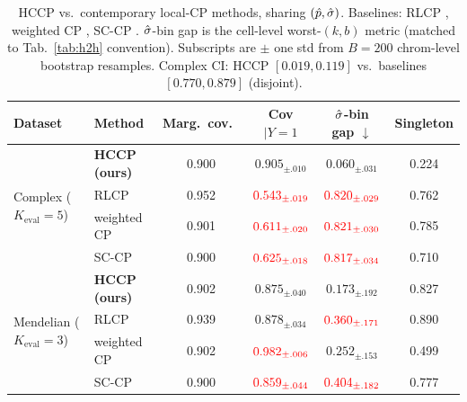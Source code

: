 \begin{table}[h]
\centering
\footnotesize
\caption{HCCP vs.\ contemporary local-CP methods, sharing $(\hat{p}, \hat{\sigma})$. Baselines: RLCP \citep{hore2025rlcp}, weighted CP \citep{tibshirani2019weighted}, SC-CP \citep{vanderlaan2024sccp}. $\hat{\sigma}$-bin gap is the cell-level worst-$(k,b)$ metric (matched to Tab.~\ref{tab:h2h} convention). Subscripts are $\pm$ one std from $B = 200$ chrom-level bootstrap resamples. Complex CI: HCCP $[0.019, 0.119]$ vs.\ baselines $[0.770, 0.879]$ (disjoint).}
\label{tab:cp_baselines}
\setlength{\tabcolsep}{3pt}
\begin{tabular}{llcccc}
\toprule
Dataset & Method & Marg.\ cov.\ & Cov$|Y{=}1$ & $\hat{\sigma}$-bin gap $\downarrow$ & Singleton \\
\midrule
\multirow{4}{*}{Complex ($K_{\mathrm{eval}} = 5$)}
 & \textbf{HCCP (ours)} & 0.900 & $\mathbf{0.905_{\pm .010}}$         & $\mathbf{0.060_{\pm .031}}$         & 0.224 \\
 & RLCP                 & 0.952 & $\textcolor{red}{0.543_{\pm .019}}$ & $\textcolor{red}{0.820_{\pm .029}}$ & 0.762 \\
 & weighted CP          & 0.901 & $\textcolor{red}{0.611_{\pm .020}}$ & $\textcolor{red}{0.821_{\pm .030}}$ & 0.785 \\
 & SC-CP                & 0.900 & $\textcolor{red}{0.625_{\pm .018}}$ & $\textcolor{red}{0.817_{\pm .034}}$ & 0.710 \\
\midrule
\multirow{4}{*}{Mendelian ($K_{\mathrm{eval}} = 3$)}
 & \textbf{HCCP (ours)} & 0.902 & $\mathbf{0.875_{\pm .040}}$         & $\mathbf{0.173_{\pm .192}}$         & 0.827 \\
 & RLCP                 & 0.939 & $0.878_{\pm .034}$                  & $\textcolor{red}{0.360_{\pm .171}}$ & 0.890 \\
 & weighted CP          & 0.902 & $\textcolor{red}{0.982_{\pm .006}}$ & $0.252_{\pm .153}$                  & 0.499 \\
 & SC-CP                & 0.900 & $\textcolor{red}{0.859_{\pm .044}}$ & $\textcolor{red}{0.404_{\pm .182}}$ & 0.777 \\
\bottomrule
\end{tabular}
\end{table}

